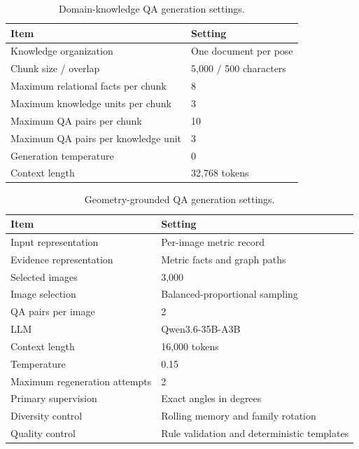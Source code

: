 \documentclass[conference]{IEEEtran}
\renewcommand{\arraystretch}{1.18}
\begin{document}
\begin{table}[h]
\centering
\caption{Domain-knowledge QA generation settings.}
\label{tab:domain_qa_config}
\small
\setlength{\tabcolsep}{4pt}
\renewcommand{\arraystretch}{1.10}
\begin{tabular}{ll}
\toprule
\textbf{Item} & \textbf{Setting} \\
\midrule
Knowledge organization & One document per pose \\
Chunk size / overlap & 5,000 / 500 characters \\
Maximum relational facts per chunk & 8 \\
Maximum knowledge units per chunk & 3 \\
Maximum QA pairs per chunk & 10 \\
Maximum QA pairs per knowledge unit & 3 \\
Generation temperature & 0 \\
Context length & 32,768 tokens \\
\bottomrule
\end{tabular}
\end{table}

\begin{table}[h]
\centering
\caption{Geometry-grounded QA generation settings.}
\label{tab:geometry_qa_settings}
\small
\setlength{\tabcolsep}{4pt}
\renewcommand{\arraystretch}{1.10}
\begin{tabular}{ll}
\toprule
\textbf{Item} & \textbf{Setting} \\
\midrule
Input representation & Per-image metric record \\
Evidence representation & Metric facts and graph paths \\
Selected images & 3,000 \\
Image selection & Balanced-proportional sampling \\
QA pairs per image & 2 \\
LLM & Qwen3.6-35B-A3B~\cite{qwen2026qwen36} \\
Context length & 16,000 tokens \\
Temperature & 0.15 \\
Maximum regeneration attempts & 2 \\
Primary supervision & Exact angles in degrees \\
Diversity control & Rolling memory and family rotation \\
Quality control & Rule validation and deterministic templates \\
\bottomrule
\end{tabular}
\end{table}
\end{document}
